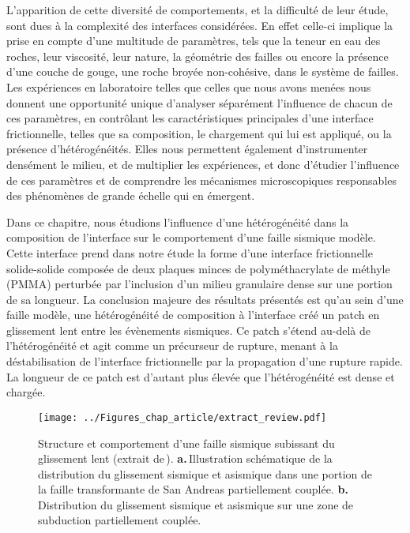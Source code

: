 L'apparition de cette diversité de comportements, et la difficulté de leur étude, sont dues à la complexité des interfaces considérées. En effet celle-ci implique la prise en compte d'une multitude de paramètres, tels que la teneur en eau des roches, leur viscosité, leur nature, la géométrie des failles ou encore la présence d'une couche de gouge, une roche broyée non-cohésive, dans le système de failles. Les expériences en laboratoire telles que celles que nous avons menées nous donnent une opportunité unique d'analyser séparément l'influence de chacun de ces paramètres, en contrôlant les caractéristiques principales d'une interface frictionnelle, telles que sa composition, le chargement qui lui est appliqué, ou la présence d'hétérogénéités. Elles nous permettent également d'instrumenter densément le milieu, et de multiplier les expériences, et donc d'étudier l'influence de ces paramètres et de comprendre les mécanismes microscopiques responsables des phénomènes de grande échelle qui en émergent.

\pagebreak

Dans ce chapitre, nous étudions l'influence d'une hétérogénéité dans la composition de l'interface sur le comportement d'une faille sismique modèle. Cette interface prend dans notre étude la forme d'une interface frictionnelle solide-solide composée de deux plaques minces de polyméthacrylate de méthyle (PMMA) perturbée par l'inclusion d'un milieu granulaire dense sur une portion de sa longueur. La conclusion majeure des résultats présentés est qu'au sein d'une faille modèle, une hétérogénéité de composition à l'interface créé un patch en glissement lent entre les évènements sismiques. Ce patch s'étend au-delà de l'hétérogénéité et agit comme un précurseur de rupture, menant à la déstabilisation de l'interface frictionnelle par la propagation d'une rupture rapide. La longueur de ce patch est d'autant plus élevée que l'hétérogénéité est dense et chargée.



\begin{figure}[h!]
\centering
\texttt{[image: ../Figures\_chap\_article/extract\_review.pdf]}
\caption[Faille en glissement lent]{Structure et comportement d'une faille sismique subissant du glissement lent (extrait de\,\cite{burgmann_geophysics_2018}). \textbf{a.}\,Illustration schématique de la distribution du glissement sismique et asismique dans une portion de la faille transformante de San Andreas partiellement couplée. \textbf{b.}\,Distribution du glissement sismique et asismique sur une zone de subduction partiellement couplée.}
\label{fig:extract_review}
\end{figure}





